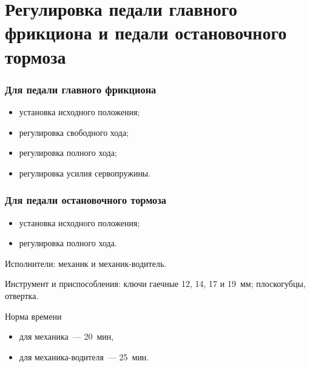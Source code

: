 \section{Регулировка педали главного фрикциона и педали остановочного тормоза}

\subsubsection{Для педали главного фрикциона}
\begin{itemize}
    \item установка исходного положения; 
    \item регулировка свободного хода; 
    \item регулировка полного хода; 
    \item регулировка усилия сервопружины.
\end{itemize}

\subsubsection{Для педали остановочного тормоза}
\begin{itemize}
    \item установка исходного положения; 
    \item регулировка полного хода. 
\end{itemize}

Исполнители: механик и механик-водитель. 

Инструмент и приспособления: ключи гаечные 12, 14, 17 и 19~мм; плоскогубцы, отвертка. 

Норма времени
\begin{itemize}
    \item для механика~--- 20~мин, 
    \item для механика-водителя~--- 25~мин. 
\end{itemize}



